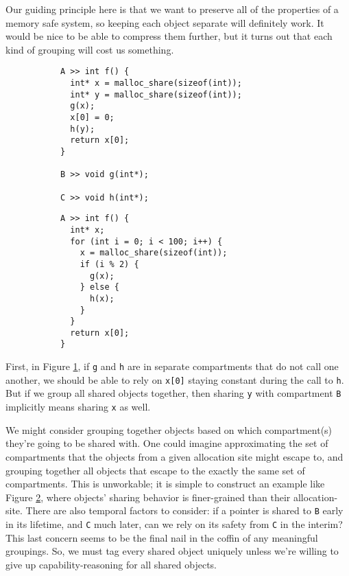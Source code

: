 \documentclass{article}
\begin{document}
Our guiding principle here is that we want to preserve all of the properties of
a memory safe system, so keeping each object separate will definitely work. It would be
nice to be able to compress them further, but it turns out that each kind of grouping will
cost us something.

\begin{figure}
  \begin{subfigure}[t]{0.49\textwidth}
\begin{verbatim}
A >> int f() {
  int* x = malloc_share(sizeof(int));
  int* y = malloc_share(sizeof(int));
  g(x);
  x[0] = 0;
  h(y);
  return x[0];
}

B >> void g(int*);

C >> void h(int*);
\end{verbatim}
    \caption{}
    \label{subfig:allshare}
  \end{subfigure}
  \begin{subfigure}[t]{0.49\textwidth}
\begin{verbatim}
A >> int f() {
  int* x;
  for (int i = 0; i < 100; i++) {
    x = malloc_share(sizeof(int));
    if (i % 2) {
      g(x);
    } else {
      h(x);
    }
  }
  return x[0];
}
\end{verbatim}
    \caption{}
    \label{subfig:escapeshare}
  \end{subfigure}

  \caption{}
  \label{fig:groupings}
\end{figure}

First, in Figure \ref{subfig:allshare}, if {\tt g} and {\tt h} are
in separate compartments that do not call one another, we should be able to rely on
{\tt x[0]} staying constant during the call to {\tt h}. But if we group all shared objects
together, then sharing {\tt y} with compartment {\tt B} implicitly means sharing
{\tt x} as well.

We might consider grouping together objects based on which compartment(s) they're going to
be shared with. One could imagine approximating the set of compartments that the objects
from a given allocation site might escape to, and grouping together all objects that escape
to the exactly the same set of compartments. This is unworkable; it is simple to construct
an example like Figure \ref{subfig:escapeshare}, where objects' sharing behavior is finer-grained
than their allocation-site. There are also temporal factors to consider: if a pointer is shared
to {\tt B} early in its lifetime, and {\tt C} much later, can we rely on its safety from
{\tt C} in the interim? This last concern seems to be the final nail in the coffin of any
meaningful groupings. So, we must tag every shared object uniquely unless we're willing
to give up capability-reasoning for all shared objects.
\end{document}
